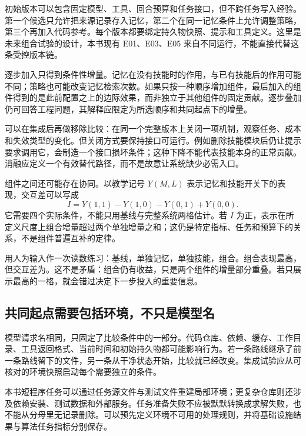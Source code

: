初始版本可以包含固定模型、工具、回合预算和任务接口，但不跨任务写入经验。第一个候选只允许把来源记录存入记忆，第二个在同一记忆条件上允许调整策略，第三个再加入代码参考。每个版本都要绑定持久物快照、提示和工具定义。这里是未来组合试验的设计，本书现有 E01、E03、E05 来自不同运行，不能直接代替这条受控版本链。

逐步加入只得到条件性增量。记忆在没有技能时的作用，与已有技能后的作用可能不同；策略也可能改变记忆检索次数。如果只按一种顺序增加组件，最后加入的组件得到的是此前配置之上的边际效果，而非独立于其他组件的固定贡献。逐步叠加仍可回答工程问题，其解释应限定为所选顺序和共同起点下的增量。

可以在集成后再做移除比较：在同一个完整版本上关闭一项机制，观察任务、成本和失效类型的变化。但关闭方式要保持接口可运行。例如删除技能模块后仍让提示要求调用它，会制造一个接口损坏条件；这种下降不能代表技能本身的正常贡献。消融应定义一个有效替代路径，而不是故意让系统缺少必需入口。

组件之间还可能存在协同。以教学记号 $Y(M,L)$ 表示记忆和技能开关下的表现，交互差可以写成
\begin{equation}
 I=Y(1,1)-Y(1,0)-Y(0,1)+Y(0,0).
 \label{eq:ch15-interaction}
\end{equation}
它需要四个实际条件，不能只用基线与完整系统两格估计。若 $I$ 为正，表示在所定义尺度上组合增量超过两个单独增量之和；这仍是特定指标、任务和预算下的关系，不是组件普遍互补的定律。

用人为输入作一次读数练习：基线，单独记忆，单独技能，组合。组合表现最高，但交互差为。这不是矛盾：组合仍有收益，只是两个组件的增量部分重叠。若只展示最高的一格，就会错过决定下一步投入的重要信息。

\subsection{共同起点需要包括环境，不只是模型名}
\label{sec:ch15-commonstart}

模型请求名相同，只固定了比较条件中的一部分。代码仓库、依赖、缓存、工作目录、工具返回格式、当前时间和初始持久物都可能影响行为。若一条路线继承了前一条路线留下的文件，另一条从干净状态开始，比较就已经改变。集成试验应从可核对的环境快照启动每个需要独立的条件。

本书短程序任务可以通过任务源文件与测试文件重建局部环境；更复杂仓库则还涉及依赖安装、测试数据和外部服务。任务准备失败不应被默默转换成求解失败，也不能从分母里无记录删除。可以预先定义环境不可用的处理规则，并将基础设施结果与算法任务指标分别保存。

